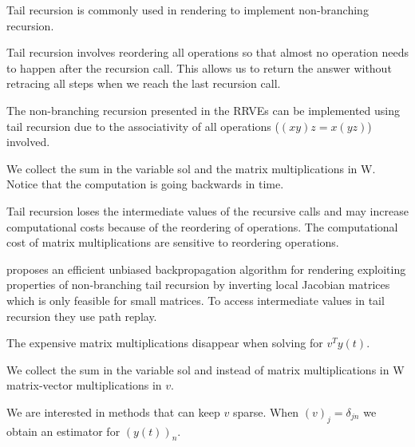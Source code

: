 \documentclass[a4paper,12pt]{article}
\begin{document}
Tail recursion is commonly used in rendering to implement non-branching recursion.

\begin{technique}
  Tail recursion involves reordering all operations
  so that almost no operation needs to happen after
  the recursion call. This allows us to return the
  answer without retracing all steps when we reach
  the last recursion call.
\end{technique}

The non-branching recursion presented in the RRVEs can
be implemented using tail recursion due to the associativity
of all operations ($(xy)z = x(yz)$) involved.

\begin{julia}
  We collect the sum in the variable sol and the matrix multiplications in W.
  Notice that the computation is going backwards in time.

\end{julia}

Tail recursion loses the intermediate values
of the recursive calls and
may increase computational costs because of the reordering of operations.
The computational cost of matrix multiplications are sensitive
to reordering operations.

\begin{related}[non-branching tail recursion]
  \cite{vicini_path_2021} proposes an efficient unbiased backpropagation
  algorithm for rendering exploiting properties of non-branching tail recursion
  by inverting local Jacobian matrices which is only feasible for small matrices.
  To access intermediate values in tail recursion they use path replay.
\end{related}


The expensive matrix multiplications disappear when solving for $v^{T}y(t)$.

\begin{julia} \label{jl:adjoint main poisson}
  We collect the sum in the variable sol and instead of matrix multiplications in W
  matrix-vector multiplications in $v$.


  We are interested in methods that can keep $v$ sparse.
  When $(v)_{j} = \delta_{jn}$ we obtain an estimator for $(y(t))_{n}$.
\end{julia}
\end{document}
